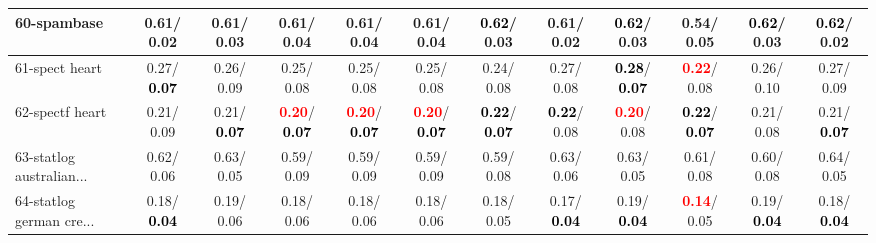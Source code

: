 \begin{table}[h]
\begin{center}
{\begin{tabular}{lc|c|c|c|c|c|c|c|c|c|c}
60-spambase &   0.61/  0.02 &   0.61/  0.03 &   0.61/  0.04 &   0.61/  0.04 &   0.61/  0.04 & \textcolor{black}{\textbf{  0.62}}/  0.03 &   0.61/  0.02 & \textcolor{black}{\textbf{  0.62}}/  0.03 &   0.54/  0.05 & \textcolor{black}{\textbf{  0.62}}/  0.03 & \textcolor{black}{\textbf{  0.62}}/  0.02 \\ \hline
61-spect heart &   0.27/\textcolor{black}{\textbf{  0.07}} &   0.26/  0.09 &   0.25/  0.08 &   0.25/  0.08 &   0.25/  0.08 &   0.24/  0.08 &   0.27/  0.08 & \textcolor{black}{\textbf{  0.28}}/\textcolor{black}{\textbf{  0.07}} & \textcolor{red}{\textbf{  0.22}}/  0.08 &   0.26/  0.10 &   0.27/  0.09 \\
62-spectf heart &   0.21/  0.09 &   0.21/\textcolor{black}{\textbf{  0.07}} & \textcolor{red}{\textbf{  0.20}}/\textcolor{black}{\textbf{  0.07}} & \textcolor{red}{\textbf{  0.20}}/\textcolor{black}{\textbf{  0.07}} & \textcolor{red}{\textbf{  0.20}}/\textcolor{black}{\textbf{  0.07}} & \textcolor{black}{\textbf{  0.22}}/\textcolor{black}{\textbf{  0.07}} & \textcolor{black}{\textbf{  0.22}}/  0.08 & \textcolor{red}{\textbf{  0.20}}/  0.08 & \textcolor{black}{\textbf{  0.22}}/\textcolor{black}{\textbf{  0.07}} &   0.21/  0.08 &   0.21/\textcolor{black}{\textbf{  0.07}} \\
63-statlog australian... &   0.62/  0.06 &   0.63/  0.05 &   0.59/  0.09 &   0.59/  0.09 &   0.59/  0.09 &   0.59/  0.08 &   0.63/  0.06 &   0.63/  0.05 &   0.61/  0.08 &   0.60/  0.08 &   0.64/  0.05 \\
64-statlog german cre... &   0.18/\textcolor{black}{\textbf{  0.04}} &   0.19/  0.06 &   0.18/  0.06 &   0.18/  0.06 &   0.18/  0.06 &   0.18/  0.05 &   0.17/\textcolor{black}{\textbf{  0.04}} &   0.19/\textcolor{black}{\textbf{  0.04}} & \textcolor{red}{\textbf{  0.14}}/  0.05 &   0.19/\textcolor{black}{\textbf{  0.04}} &   0.18/\textcolor{black}{\textbf{  0.04}} \\\end{tabular}}\label{stratsALCKappa1aC4.5}
\end{center}
\end{table}
